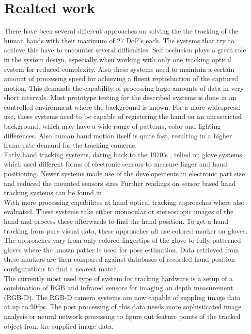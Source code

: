\section{Realted work}
\label{sec:realted_work}
There have been several different approaches on solving the the tracking of the human hands with their maximum of 27 DoF's each.
The systems that try to achieve this have to encounter several difficulties. Self occlusion plays a great role in the system design, especially when working with only one tracking optical system for reduced complexity. Also these systems need to maintain a certain amount of processing speed for achieving a fluent reproduction of the captured motion. This demands the capability of processing large amounts of data in very short intervals. Most prototype testing for the described systems is done in an controlled environment where the background is known. For a more widespread use, these systems need to be capable of registering the hand on an unrestricted background, which may have a wide range of patterns, color and lighting differences. Also human hand motion itself is quite fast, resulting in a higher frame rate demand for the tracking cameras.\\
Early hand tracking systems, dating back to the 1970's \cite{ThomasA.DeFanti.1977,Grimes.1983}, relied on glove systems which used different forms of electronic sensors to measure finger and hand positioning. Newer systems made use of the developements in electronic part size and reduced the mounted sensors sizes\cite{Kuroda.2004,HernandezRebollar.2002}
Further readings on sensor based hand tracking systems can be found in \cite{Dipietro.2008,Sturman.1994}.\\
With more processing capabilites at hand optical tracking approaches where also evaluated\cite{Duca.2007,Fredriksson.2008,Wang.2009}. These systems take either monocular or stereoscopic images of the hand and process these afterwards to find the hand position. To get a hand tracking from pure visual data, these approaches all use colored marker on gloves. The approaches vary from only colored fingertips\cite{Fredriksson.2008} of the glove to fully patterned gloves\cite{Wang.2009} where the known patter is used for pose estimation. Data retrieved from these markers are then compared against databases of recorded hand position configurations to find a nearest match.\\
The currently most used type of system for tracking hardware is a setup of a combination of RGB and infrared sensors for imaging an depth measurement (RGB-D)\cite{Zhang.2012,Weichert.2013,IntelCorporation.2018}. The RGB-D camera systems are now capable of suppling image data at up to 90fps. The post processing of this data needs more sophisticated image analysis or neural network processing to figure out feature points of the tracked object from the supplied image data\cite{JamieShotton.2011,Oikonomidis.2011b}.\\
